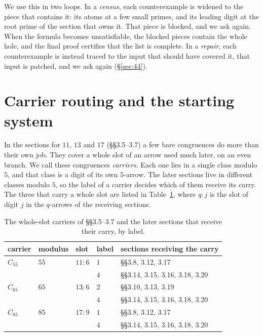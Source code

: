\documentclass[11pt]{amsart}
\theoremstyle{definition}
\theoremstyle{remark}
\begin{document}
We use this in two loops. In a \emph{census}, each counterexample is widened to the piece that contains it: its
atoms at a few small primes, and its leading digit at the root prime of the section that owns it. That piece is
blocked, and we ask again. When the formula becomes unsatisfiable, the blocked pieces contain the whole hole, and
the final proof certifies that the list is complete. In a \emph{repair}, each counterexample is instead traced to the
input that should have covered it, that input is patched, and we ask again (§\ref{sec:44}).

\section{Carrier routing and the starting system}\label{sec:carriers}

In the sections for $11$, $13$ and $17$ (§§3.5--3.7) a few bare congruences do more than their own job. They cover a
whole slot of an arrow used much later, on an even branch. We call these congruences \emph{carriers}. Each one lies
in a single class modulo $5$, and that class is a digit of its own $5$-arrow. The later sections live in different
classes modulo $5$, so the label of a carrier decides which of them receive its carry. The three that carry a whole
slot are listed in Table~\ref{tab:carriers}, where $q{:}j$ is the slot of digit $j$ in the $q$-arrows of the
receiving sections.

\begin{table}[ht]
\centering
\caption{The whole-slot carriers of §§3.5--3.7 and the later sections that receive their carry, by label.}\label{tab:carriers}
\begin{tabular}{@{}lllll@{}}
\toprule
carrier & modulus & slot & label & sections receiving the carry\\
\midrule
$C_{55}$ & $55$ & $11{:}6$ & $1$ & §§3.8, 3.12, 3.17\\
         &      &          & $4$ & §§3.14, 3.15, 3.16, 3.18, 3.20\\
$C_{65}$ & $65$ & $13{:}6$ & $2$ & §§3.10, 3.13, 3.19\\
         &      &          & $4$ & §§3.14, 3.15, 3.16, 3.18, 3.20\\
$C_{85}$ & $85$ & $17{:}9$ & $1$ & §§3.8, 3.12, 3.17\\
         &      &          & $4$ & §§3.14, 3.15, 3.16, 3.18, 3.20\\
\bottomrule
\end{tabular}
\end{table}
\end{document}
